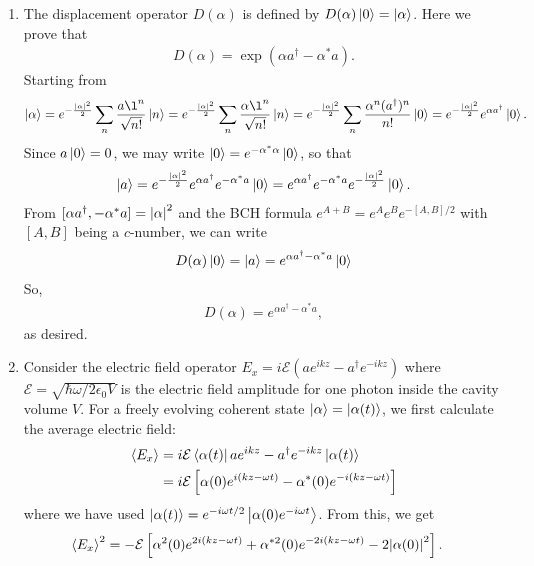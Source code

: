 \documentclass{article}
\theoremstyle{definition}
\newcommand{\al}{\alpha}
\newcommand{\f}[2]{\frac{#1}{#2}}
\newcommand{\lp}{\left(}
\newcommand{\rp}{\right)}
\newcommand{\lb}{\left[}
\newcommand{\rb}{\right]}
\begin{document}
\begin{enumerate}[label=\alph*)]
	\item The displacement operator $D(\al)$ is defined by $D(\al)\ket{0} = \ket{\al}$. Here we prove that 
	\begin{align*}
		D(\al) = \exp\lp \al a^\dagger - \al^* a \rp.
	\end{align*}
	Starting from 
	\begin{align*}
	\ket{\al} = e^{-\f{\abs{\al}^2}{2}} \sum_{n} \f{a\l^n}{\sqrt{n!}}\ket{n} = e^{-\f{\abs{\al}^2}{2}} \sum_{n} \f{\al\l^n}{\sqrt{n!}}\ket{n} = e^{-\f{\abs{\al}^2}{2}} \sum_n \f{\al^n (a^\dagger)^n}{n!} \ket{0} = e^{-\f{\abs{\al}^2}{2}} e^{\al a^\dagger} \ket{0}.
	\end{align*}
	Since $a\ket{0} = 0$, we may write $\ket{0} = e^{-\al^* \al} \ket{0}$, so that
	\begin{align*}
	\ket{a} = e^{-\f{\abs{\al}^2}{2} } e^{\al a^\dagger} e^{-\al^* a} \ket{0} = e^{\al a^\dagger} e^{-\al^* a} e^{-\f{\abs{\al}^2}{2}} \ket{0}.
	\end{align*}
	From $[\al a^\dagger, -\al^* a] = \abs{\al}^2$ and the BCH formula $e^{A+B} = e^A e^B e^{-[A,B]/2}$ with $[A,B]$ being a $c$-number, we can write 
	\begin{align*}
	D(\al)\ket{0} = \ket{a} = e^{\al a^\dagger - \al^* a} \ket{0}
	\end{align*}
	So,
	\begin{align*}
	D(\al) = e^{\al a^\dagger - \al^* a},
	\end{align*}
	 as desired. 
	
	
		
	\item Consider the electric field operator $E_x = i\mathcal{E}\lp ae^{ikz} - a^\dagger e^{-ikz} \rp$ where $\mathcal{E} = \sqrt{\hbar\omega/2\epsilon_0V}$ is the electric field amplitude for one photon inside the cavity volume $V$. For a freely evolving coherent state $\ket{\al} = \ket{\al(t)}$, we first calculate the average electric field:
	\begin{align*}
		\langle E_x \rangle 
		&= i\mathcal{E} \bra{\al(t)}  ae^{ikz} - a^\dagger e^{-ikz}   \ket{\al(t)} \\
		&= i\mathcal{E}\lb  \al(0) e^{i(kz - \omega t)} - \al^*(0) e^{-i(kz - \omega t)} \rb
	\end{align*}
	where we have used $\ket{\al(t)} = e^{-i\omega t/2} \ket{\al(0) e^{-i\omega t}}$. From this, we get
	\begin{align*}
		{\langle E_x \rangle}^2 &= -\mathcal{E} \lb  \al^2(0) e^{2i(kz-\omega t)}  + \al^{*2}(0) e^{-2i(kz-\omega t)} - 2 \abs{\al(0)}^2 \rb.
	\end{align*}


\end{enumerate}
\end{document}
